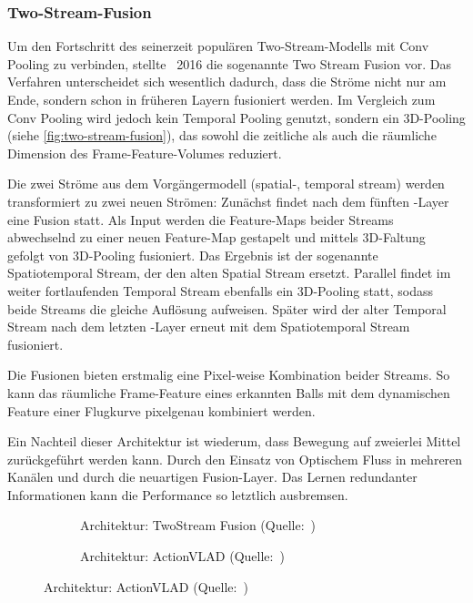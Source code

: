 \subsubsection{Two-Stream-Fusion}

Um den Fortschritt des seinerzeit populären Two-Stream-Modells mit Conv Pooling zu verbinden, stellte~\cite{Feichtenhofer16} 2016 die sogenannte Two Stream Fusion vor.
Das Verfahren unterscheidet sich wesentlich dadurch, dass die Ströme nicht nur am Ende, sondern schon in früheren Layern fusioniert werden.
Im Vergleich zum Conv Pooling wird jedoch kein Temporal Pooling genutzt, sondern ein 3D-Pooling (siehe \autoref{fig:two-stream-fusion}), das sowohl die zeitliche als auch die räumliche Dimension des Frame-Feature-Volumes reduziert.

Die zwei Ströme aus dem Vorgängermodell (spatial-, temporal stream) werden transformiert zu zwei neuen Strömen:
Zunächst findet nach dem fünften \conv-Layer eine Fusion statt.
Als Input werden die Feature-Maps beider Streams abwechselnd zu einer neuen Feature-Map gestapelt und mittels 3D-Faltung gefolgt von 3D-Pooling fusioniert.
Das Ergebnis ist der sogenannte Spatiotemporal Stream, der den alten Spatial Stream ersetzt.
Parallel findet im weiter fortlaufenden Temporal Stream ebenfalls ein 3D-Pooling statt, sodass beide Streams die gleiche Auflösung aufweisen.
Später wird der alter Temporal Stream nach dem letzten \fc-Layer erneut mit dem Spatiotemporal Stream fusioniert.

Die Fusionen bieten erstmalig eine Pixel-weise Kombination beider Streams.
So kann \zB das räumliche Frame-Feature eines erkannten Balls mit dem dynamischen Feature einer Flugkurve pixelgenau kombiniert werden.

Ein Nachteil dieser Architektur ist wiederum, dass Bewegung auf zweierlei Mittel zurückgeführt werden kann.
Durch den Einsatz von Optischem Fluss in mehreren Kanälen und durch die neuartigen Fusion-Layer.
Das Lernen redundanter Informationen kann die Performance so letztlich ausbremsen.

\begin{figure}
    \centering
    \begin{subfigure}[b]{.5\textwidth}
        \centering
        \caption{Architektur: TwoStream Fusion (Quelle:~\cite{Feichtenhofer16})}
        \label{fig:two-stream-fusion}
    \end{subfigure}%
    \begin{subfigure}[b]{.5\textwidth}
        \centering
        \caption{Architektur: ActionVLAD (Quelle:~\cite{Girdhar17})}
        \label{fig:avlad}
    \end{subfigure}
\end{figure}

